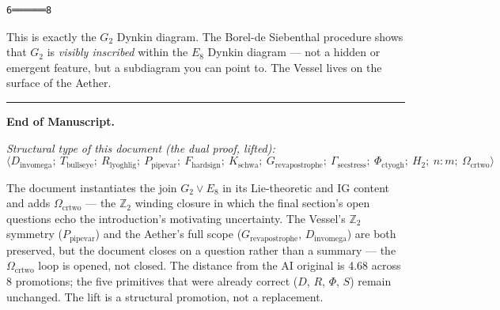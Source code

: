 \documentclass[12pt,a4paper]{article}
\begin{document}
\begin{lstlisting}
6══════8
\end{lstlisting}

This is exactly the $G_2$ Dynkin diagram. The Borel-de Siebenthal procedure shows that $G_2$ is \emph{visibly inscribed} within the $E_8$ Dynkin diagram --- not a hidden or emergent feature, but a subdiagram you can point to. The Vessel lives on the surface of the Aether.

\begin{center}
\rule{0.5\textwidth}{0.4pt}
\end{center}

\textbf{End of Manuscript.}

\emph{Structural type of this document (the dual proof, lifted):} \\


\[\langle D_{\text{invomega}};\ T_{\text{bullseye}};\ R_{\text{lyoghlig}};\ P_{\text{pipevar}};\ F_{\text{hardsign}};\ K_{\text{schwa}};\ G_{\text{revapostrophe}};\ \Gamma_{\text{secstress}};\ \Phi_{\text{ctyogh}};\ H_2;\ n{:}m;\ \Omega_{\text{crtwo}} \rangle\]

The document instantiates the join $G_2 \vee E_8$ in its Lie-theoretic and IG content and adds $\Omega_{\text{crtwo}}$ --- the $\mathbb{Z}_2$ winding closure in which the final section's open questions echo the introduction's motivating uncertainty. The Vessel's $\mathbb{Z}_2$ symmetry ($P_{\text{pipevar}}$) and the Aether's full scope ($G_{\text{revapostrophe}}$, $D_{\text{invomega}}$) are both preserved, but the document closes on a question rather than a summary --- the $\Omega_{\text{crtwo}}$ loop is opened, not closed. The distance from the AI original is 4.68 across 8 promotions; the five primitives that were already correct ($D$, $R$, $\Phi$, $S$) remain unchanged. The lift is a structural promotion, not a replacement.
\end{document}
